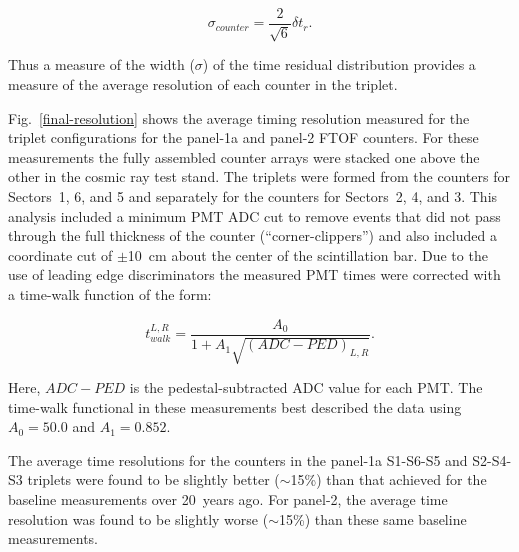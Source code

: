 \documentclass{elsart}
\begin{document}
\begin{equation}
\label{sig-counter}
\sigma_{counter} = \frac{2}{\sqrt{6}} \delta t_r.
\end{equation}

\noindent
Thus a measure of the width ($\sigma$) of the time residual distribution provides a measure of the average
resolution of each counter in the triplet. 

Fig.~\ref{final-resolution} shows the average timing resolution measured for the triplet configurations for the
panel-1a and panel-2 FTOF counters. For these measurements the fully assembled counter arrays were stacked
one above the other in the cosmic ray test stand. The triplets were formed from the counters for Sectors~1, 6,
and 5 and separately for the counters for Sectors~2, 4, and 3. This analysis included a minimum PMT ADC cut to
remove events that did not pass through the full thickness of the counter (``corner-clippers'') and also included a
coordinate cut of $\pm$10~cm about the center of the scintillation bar. Due to the use of leading edge
discriminators the measured PMT times were corrected with a time-walk function of the form:

\begin{equation}
\label{walk-function}
t_{walk}^{L,R} = \frac{A_0}{1 + A_1 \sqrt{(ADC - PED)_{L,R}}}.
\end{equation}

\noindent
Here, $ADC - PED$ is the pedestal-subtracted ADC value for each PMT. The time-walk functional in
these measurements best described the data using $A_0 = 50.0$ and $A_1 = 0.852$.

The average time resolutions for the counters in the panel-1a S1-S6-S5 and S2-S4-S3 triplets were
found to be slightly better ($\sim$15\%) than that achieved for the baseline measurements over
20~years ago. For panel-2, the average time resolution was found to be slightly worse ($\sim$15\%)
than these same baseline measurements.
\end{document}
